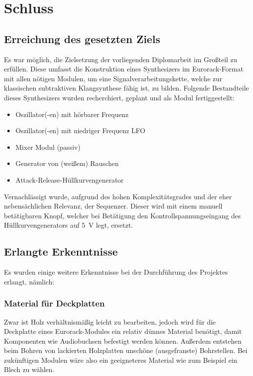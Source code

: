 \chapter{Schluss}

\section{Erreichung des gesetzten Ziels}
\label{sec:org5797aed}
Es war möglich, die Zielsetzung der vorliegenden Diplomarbeit im Großteil zu erfüllen. Diese umfasst die Konstruktion eines Synthesizers im Eurorack-Format mit allen nötigen Modulen, um eine Signalverarbeitungskette, welche zur klassischen subtraktiven Klangsynthese fähig ist, zu bilden. Folgende Bestandteile dieses Synthesizers wurden recherchiert, geplant und als Modul fertiggestellt:

\begin{itemize}
\item Oszillator(-en) mit hörbarer Frequenz
\item Oszillator(-en) mit niedriger Frequenz \ac{LFO}
\item Mixer Modul (passiv)
\item Generator von (weißem) Rauschen
\item Attack-Release-Hüllkurvengenerator
\end{itemize}

Vernachlässigt wurde, aufgrund des hohen Komplexitätsgrades und der eher nebensächlichen Relevanz, der Sequenzer. Dieser wird mit einem manuell betätigbaren Knopf, welcher bei Betätigung den Kontrollspannungseingang des Hüllkurvengenerators auf \SI{5}{\volt} legt, ersetzt.

\section{Erlangte Erkenntnisse}
\label{sec:org0fad67b}
Es wurden einige weitere Erkenntnisse bei der Durchführung des Projektes erlangt, nämlich:

\subsection{Material für Deckplatten}
\label{sec:orgb988cbd}
Zwar ist Holz verhältnismäßig leicht zu bearbeiten, jedoch wird für die Deckplatte eines Eurorack-Modules ein relativ dünnes Material benötigt, damit Komponenten wie Audiobuchsen befestigt werden können. Außerdem entstehen beim Bohren von lackierten Holzplatten unschöne (ausgefranste) Bohrstellen. Bei zukünftigen Modulen wäre also ein geeigneteres Material wie zum Beispiel ein Blech zu wählen.

